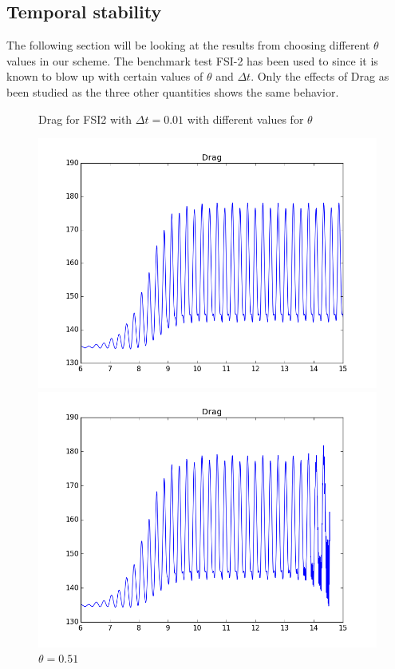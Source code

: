 \subsection{Temporal stability}
The following section will be looking at the results from choosing different $\theta$ values in our scheme. The benchmark test FSI-2 has been used to since it is known to blow up with certain values of $\theta$ and $\Delta t$. Only the effects of Drag as been studied as the three other quantities shows the same behavior.   


\begin{figure}[H]  \label{fig:FSI2drag_plots} 
  \caption {Drag for FSI2 with $\Delta t = 0.01$ with different values for $\theta$}
  \begin{minipage}[b]{0.5\linewidth}
    \centering
    \includegraphics[scale=0.35]{./Verification_Validation/Temporal_stability/FSI2_001_051_big.png} 
    \caption{$\theta = 0.51 $} 
    \vspace{4ex}
  \end{minipage}%
  \begin{minipage}[b]{0.5\linewidth}
    \centering
    \includegraphics[scale=0.35]{./Verification_Validation/Temporal_stability/FSI2_001_050_big.png} 

\end{minipage}
\end{figure}
